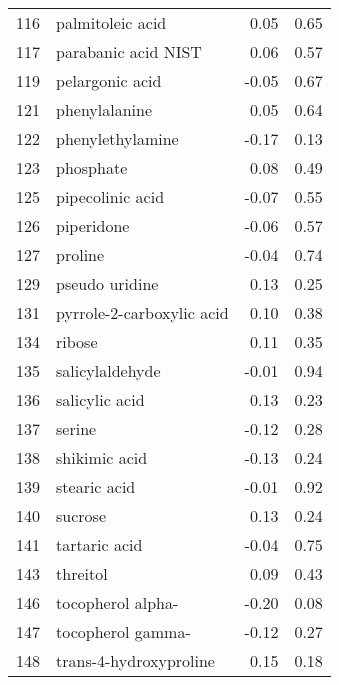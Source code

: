 \begin{tabular}{llrr}
116 &                   palmitoleic acid &                 0.05 &     0.65 \\
117 &                parabanic acid NIST &                 0.06 &     0.57 \\
119 &                    pelargonic acid &                -0.05 &     0.67 \\
121 &                      phenylalanine &                 0.05 &     0.64 \\
122 &                   phenylethylamine &                -0.17 &     0.13 \\
123 &                          phosphate &                 0.08 &     0.49 \\
125 &                   pipecolinic acid &                -0.07 &     0.55 \\
126 &                         piperidone &                -0.06 &     0.57 \\
127 &                            proline &                -0.04 &     0.74 \\
129 &                     pseudo uridine &                 0.13 &     0.25 \\
131 &          pyrrole-2-carboxylic acid &                 0.10 &     0.38 \\
134 &                             ribose &                 0.11 &     0.35 \\
135 &                    salicylaldehyde &                -0.01 &     0.94 \\
136 &                     salicylic acid &                 0.13 &     0.23 \\
137 &                             serine &                -0.12 &     0.28 \\
138 &                      shikimic acid &                -0.13 &     0.24 \\
139 &                       stearic acid &                -0.01 &     0.92 \\
140 &                            sucrose &                 0.13 &     0.24 \\
141 &                      tartaric acid &                -0.04 &     0.75 \\
143 &                           threitol &                 0.09 &     0.43 \\
146 &                  tocopherol alpha- &                -0.20 &     0.08 \\
147 &                  tocopherol gamma- &                -0.12 &     0.27 \\
148 &             trans-4-hydroxyproline &                 0.15 &     0.18 \\

\end{tabular}
